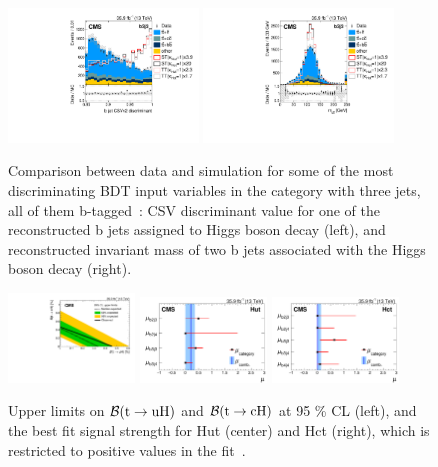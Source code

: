 \documentclass{PoS}
\begin{document}
\begin{figure}[htb]
\centering
\includegraphics[width=0.45\textwidth]{figures/CMS-TOP-17-003_Figure_002-b}
\includegraphics[width=0.45\textwidth]{figures/CMS-TOP-17-003_Figure_002-c}
\caption{
  Comparison between data and simulation for some of the most discriminating
  BDT input variables in the category with three jets, all of them
  b-tagged~\cite{top-17-003}: CSV discriminant value for one of the
  reconstructed b jets assigned to Higgs boson decay (left), and reconstructed
  invariant mass of two b jets associated with the Higgs boson decay (right).
}
\label{fig:TOP-17-003_Figure_002}
\end{figure}


\begin{figure}[htb]
\centering
\includegraphics[width=0.3\textwidth]{figures/CMS-TOP-17-003_Figure_006}
\includegraphics[width=0.3\textwidth]{figures/CMS-TOP-17-003_Figure_007-a}
\includegraphics[width=0.3\textwidth]{figures/CMS-TOP-17-003_Figure_007-b}
\caption{
  Upper limits on ${\cal B}({\rm t \to uH})$ and ${\cal B}({\rm t \to cH})$ at
  95 \% CL (left), and the best fit signal strength for Hut (center) and Hct
  (right), which is restricted to positive values in the fit~\cite{top-17-003}.
}
\label{fig:TOP-17-003_Figures_006-007}
\end{figure}
\end{document}
